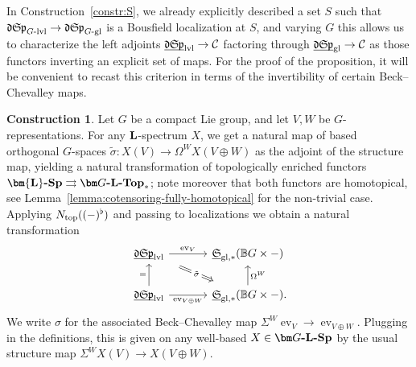 \documentclass[reqno]{memo-l}
\theoremstyle{mythm}
\theoremstyle{definition}
\newtheorem{constr}[thm]{Construction}
\numberwithin{equation}{section}
\newcommand{\Cc}{{\mathcal{C}}}
\newcommand{\gl}{\textup{gl}}
\DeclareMathOperator{\ev}{ev}
\newcommand{\Ntop}{{N_\textup{top}}}
\newcommand{\cat}[1]{\textbf{\textup{#1}}}
\newcommand{\dual}{\flat}
\newcommand{\BGcat}[1]{\mathbb B{#1}}
\newcommand{\ulhelper}[2]{\underline{\setbox0=\hbox{$#1#2$}\dp0=0.4pt \box0\relax}}
\newcommand{\ul}[1]{{\mathpalette\ulhelper{#1}}\hbox{\rule[-2pt]{0pt}{0pt}}}
\newcommand{\mySp}{{\mathfrak S\kern-.5pt\mathfrak p}}
\newcommand{\myLSp}{{\mathfrak d\kern-.25pt}\mySp}
\newcommand{\ulmySplev}{\ul{\myLSp}_\textup{lvl}}
\newcommand{\myS}{{{\mathfrak S\kern-.4pt}}}
\begin{document}
In Construction~\ref{constr:S}, we already explicitly described a set $S$ such that $\myLSp_\text{$G$-lvl}\to\myLSp_\text{$G$-gl}$ is a Bousfield localization at $S$, and varying $G$ this allows us to characterize the left adjoints $\ulmySplev\to\Cc$ factoring through $\ul\myLSp_\gl\to\Cc$ as those functors inverting an explicit set of maps. For the proof of the proposition, it will be convenient to recast this criterion in terms of the invertibility of certain Beck--Chevalley maps.

\begin{constr}\label{constr:sigma-as-BC}
    Let $G$ be a compact Lie group, and let $V,W$ be $G$-representations. For any $\cat L$-spectrum $X$, we get a natural map of based orthogonal $G$-spaces $\tilde\sigma\colon X(V)\to\Omega^WX(V\oplus W)$ as the adjoint of the structure map, yielding a natural transformation of topologically enriched functors $\cat{$\bm{\cat L}$-Sp}\rightrightarrows\cat{$\bm G$-${\cat L}$-Top}_*$; note moreover that both functors are homotopical, see Lemma~\ref{lemma:cotensoring-fully-homotopical} for the non-trivial case. Applying $\Ntop((-)^\dual)$ and passing to localizations we obtain a natural transformation
    \[
        \begin{tikzcd}
            \ulmySplev\arrow[from=d,"="]\arrow[dr,Rightarrow,"\tilde\sigma"{description},shorten=1em]\arrow[r,"\ev_V"] &[1em] \ul\myS_{\gl,*}(\BGcat{G}\times-)\arrow[from=d,"\Omega^W"']\\
            \ulmySplev\arrow[r,"\ev_{V\oplus W}"']&\ul\myS_{\gl,*}(\BGcat{G}\times-)\rlap.
        \end{tikzcd}
    \]
    We write $\sigma$ for the associated Beck--Chevalley map $\Sigma^W\ev_{V}\to\ev_{V\oplus W}$. Plugging in the definitions, this is given on any well-based $X\in\cat{$\bm G$-$\cat{L}$-Sp}$ by the usual structure map $\Sigma^WX(V)\to X(V\oplus W)$.
\end{constr}
\end{document}
